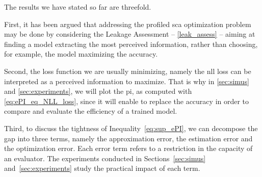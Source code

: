 The results we have stated so far are threefold.

First, it has been argued that addressing the profiled \gls{sca} optimization problem may be done by considering the Leakage Assessment -- \ie{} \autoref{leak_assess} -- aiming at finding a model extracting the most perceived information, rather than choosing, for example, the model maximizing the accuracy.

Second, the loss function we are usually minimizing, namely the \gls{nll} loss can be interpreted as a perceived information to maximize. 
That is why in \autoref{sec:simus} and \autoref{sec:experiments}, we will plot the \gls{pi}, as computed with \autoref{eq:ePI_eq_NLL_loss}, since it will enable to replace the accuracy in order to compare and evaluate the efficiency of a trained model.

Third, to discuss the tightness of Inequality~\eqref{eq:sup_ePI}, we can decompose the gap into three terms, namely the approximation error, the estimation error and the optimization error. 
Each error term refers to a restriction in the capacity of an evaluator.
The experiments conducted in Sections~\ref{sec:simus} and~\ref{sec:experiments} study the practical impact of each term.